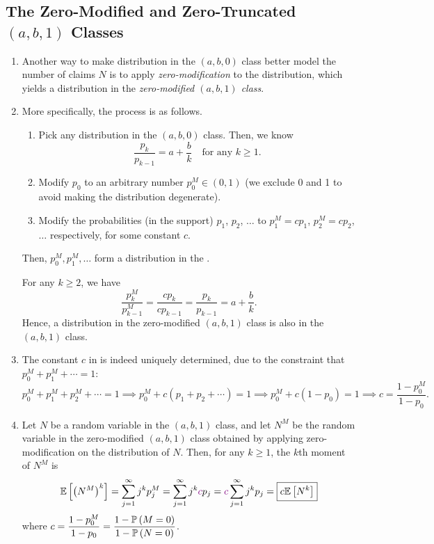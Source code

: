 \subsection{The Zero-Modified and Zero-Truncated \((a,b,1)\) Classes}
\begin{enumerate}
\item Another way to make distribution in the \((a,b,0)\) class better model
the number of claims \(N\) is to apply \emph{zero-modification} to the
distribution, which yields a distribution in the \emph{zero-modified
\((a,b,1)\) class}.
\item \label{it:zero-modify-process}
More specifically, the  process is as follows.
\begin{enumerate}
\item Pick any distribution in the \((a,b,0)\) class. Then, we know
\[
\frac{p_k}{p_{k-1}}=a+\frac{b}{k}\quad\text{for any \(k\ge 1\)}.
\]
\item Modify \(p_0\) to an arbitrary number \(p_0^{M}\in(0,1)\) (we exclude 0
and 1 to avoid making the distribution degenerate).
\item Modify the probabilities (in the support) \(p_1\), \(p_2\), \(\dotsc\) to
\(p_1^M=cp_1\), \(p_2^M=cp_2\),\(\dotsc\) respectively, for some constant
\(c\).
\end{enumerate}
Then, \(p_0^M,p_1^M,\dotsc\) form a distribution in the .

\begin{note}
For any \(k\ge 2\), we have
\[
\frac{p_k^M}{p_{k-1}^M}=\frac{cp_k}{cp_{k-1}}=\frac{p_k}{p_{k-1}}=a+\frac{b}{k}.
\]
Hence, a distribution in the zero-modified \((a,b,1)\) class is also in the
\((a,b,1)\) class.
\end{note}
\item \label{it:zm-const-c-fmla}
The constant \(c\) in  is indeed
uniquely determined, due to the constraint that \(p_0^M+p_1^M+\dotsb=1\):
\[
p_0^M+p_1^M+p_2^M+\dotsb=1
\implies
p_0^M+c(p_1+p_2+\dotsb)=1
\implies
p_0^M+c(1-p_0)=1
\implies
c=\boxed{\frac{1-p_0^M}{1-p_0}}.
\]
\item \label{it:zm-kth-moment}
Let \(N\) be a random variable in the \((a,b,1)\) class, and let \(N^M\) be
the random variable in the zero-modified \((a,b,1)\) class obtained by applying
zero-modification on the distribution of \(N\). Then, for any \(k\ge 1\), the
\(k\)th moment of \(N^M\) is
\[
\mathbb{E}\left[\qty(N^M)^{k}\right]=\sum_{j=1}^{\infty}j^kp_j^M 
=\sum_{j=1}^{\infty}j^k {\color{violet}c}p_j
={\color{violet}c}\sum_{j=1}^{\infty}j^k p_j
=\boxed{c\mathbb{E}\left[N^k\right]}
\]
where \(\displaystyle c=\frac{1-p_0^M}{1-p_0}=\frac{1-\mathbb{P}\left(M=0\right)}{1-\mathbb{P}\left(N=0\right)}\).


\end{enumerate}
